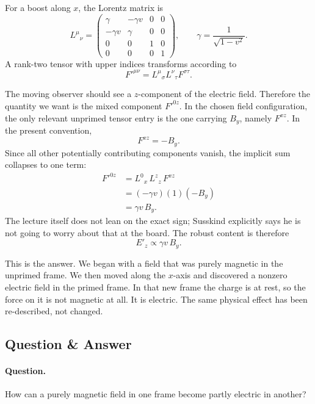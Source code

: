 For a boost along $x$, the Lorentz matrix is
\begin{equation}
L^\mu{}_\nu=
\begin{pmatrix}
\gamma&-\gamma v&0&0\\
-\gamma v&\gamma&0&0\\
0&0&1&0\\
0&0&0&1
\end{pmatrix},
\qquad
\gamma=\frac{1}{\sqrt{1-v^2}}.
\end{equation}
A rank-two tensor with upper indices transforms according to
\begin{equation}
F'^{\mu\nu}=L^\mu{}_\sigma L^\nu{}_\tau F^{\sigma\tau}.
\end{equation}

The moving observer should see a $z$-component of the electric field. Therefore the quantity we want is the mixed component $F'^{0z}$. In the chosen field configuration, the only relevant unprimed tensor entry is the one carrying $B_y$, namely $F^{xz}$. In the present convention,
\begin{equation}
F^{xz}=-B_y.
\end{equation}
Since all other potentially contributing components vanish, the implicit sum collapses to one term:
\begin{align}
F'^{0z}
&=L^0{}_x\,L^z{}_z\,F^{xz} \\
&=(-\gamma v)(1)(-B_y) \\
&=\gamma v\,B_y.
\end{align}
The lecture itself does not lean on the exact sign; Susskind explicitly says he is not going to worry about that at the board. The robust content is therefore
\begin{equation}
E'_z\propto \gamma v\,B_y.
\end{equation}

This is the answer. We began with a field that was purely magnetic in the unprimed frame. We then moved along the $x$-axis and discovered a nonzero electric field in the primed frame. In that new frame the charge is at rest, so the force on it is not magnetic at all. It is electric. The same physical effect has been re-described, not changed.

\subsection{Question \& Answer}

\paragraph{Question.} How can a purely magnetic field in one frame become partly electric in another?

